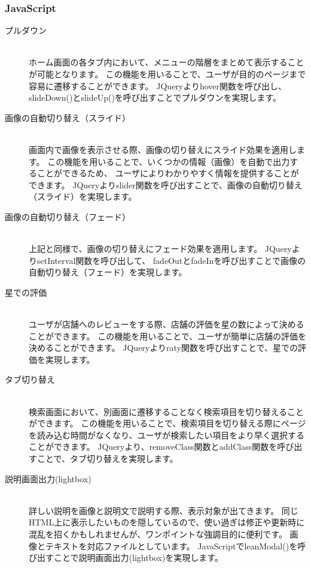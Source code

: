 \documentclass[a4j,titlepage]{jarticle}
\begin{document}
\subsubsection{JavaScript}
\begin{description}
\item [プルダウン]~\\
ホーム画面の各タブ内において、メニューの階層をまとめて表示することが可能となります。
この機能を用いることで、ユーザが目的のページまで容易に遷移することができます。
JQueryよりhover関数を呼び出し、slideDown()とslideUp()を呼び出すことでプルダウンを実現します。

\item [画像の自動切り替え（スライド）]~\\
画面内で画像を表示させる際、画像の切り替えにスライド効果を適用します。
この機能を用いることで、いくつかの情報（画像）を自動で出力することができるため、
ユーザによりわかりやすく情報を提供することができます。
JQueryよりslider関数を呼び出すことで、画像の自動切り替え（スライド）を実現します。

\item[画像の自動切り替え（フェード）]~\\
上記と同様で、画像の切り替えにフェード効果を適用します。
JQueryよりsetInterval関数を呼び出して、
fadeOutとfadeInを呼び出すことで画像の自動切り替え（フェード）を実現します。

\item[星での評価]~\\
ユーザが店舗へのレビューをする際、店舗の評価を星の数によって決めることができます。
この機能を用いることで、ユーザが簡単に店舗の評価を決めることができます。
JQueryよりraty関数を呼び出すことで、星での評価を実現します。

\item[タブ切り替え]~\\
検索画面において、別画面に遷移することなく検索項目を切り替えることができます。
この機能を用いることで、検索項目を切り替える際にページを読み込む時間がなくなり、ユーザが検索したい項目をより早く選択することができます。
JQueryより、removeClass関数とaddClass関数を呼び出すことで、タブ切り替えを実現します。

\item[説明画面出力(lightbox)]~\\
詳しい説明を画像と説明文で説明する際、表示対象が出てきます。
同じHTML上に表示したいものを隠しているので、使い過ぎは修正や更新時に混乱を招くかもしれませんが、ワンポイントな強調目的に便利です。
画像とテキストを対応ファイルとしています。
JavaScriptでleanModal()を呼び出すことで説明画面出力(lightbox)を実現します。


\end{description}
\end{document}
